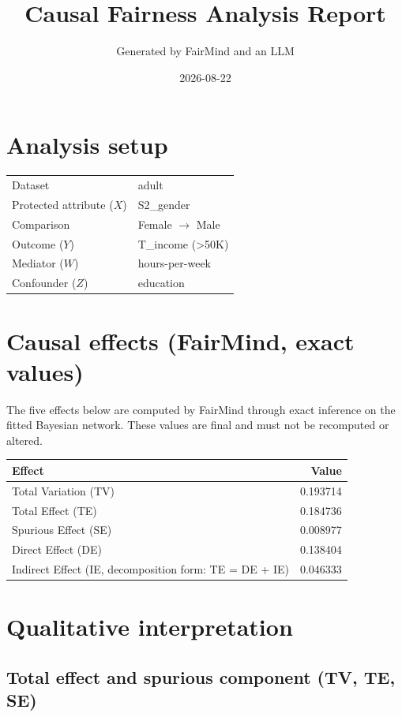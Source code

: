 \documentclass[11pt]{article}
\title{Causal Fairness Analysis Report}
\author{Generated by FairMind and an LLM}
\date{2026-08-22}
\begin{document}
\maketitle

\section{Analysis setup}

\begin{tabular}{ll}
\toprule
Dataset & adult \\
Protected attribute ($X$) & S2\_gender \\
Comparison & Female $\to$ Male \\
Outcome ($Y$) & T\_income (>50K) \\
Mediator ($W$) & hours-per-week \\
Confounder ($Z$) & education \\
\bottomrule
\end{tabular}

\section{Causal effects (FairMind, exact values)}

The five effects below are computed by FairMind through exact inference on the
fitted Bayesian network. These values are final and must not be recomputed or
altered.

\begin{tabular}{lr}
\toprule
Effect & Value \\
\midrule
Total Variation (TV) & 0.193714 \\
Total Effect (TE) & 0.184736 \\
Spurious Effect (SE) & 0.008977 \\
Direct Effect (DE) & 0.138404 \\
Indirect Effect (IE, decomposition form: TE = DE + IE) & 0.046333 \\
\bottomrule
\end{tabular}

\section{Qualitative interpretation}

\subsection{Total effect and spurious component (TV, TE, SE)}
\end{document}
